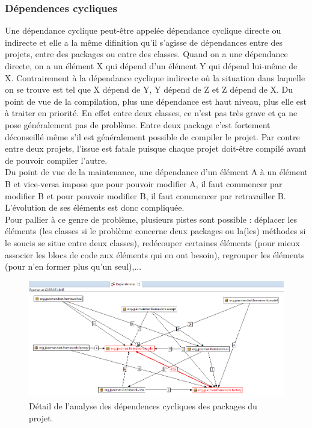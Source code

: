 \documentclass[12pt,a4paper,final]{article}
\begin{document}
\subsubsection{Dépendences cycliques}\label{dépendances}
Une dépendance cyclique peut-être appelée dépendance cyclique directe ou indirecte et elle a la même difinition qu'il s'agisse de dépendances entre des projets, entre des packages ou entre des classes. Quand on a une dépendance directe, on a un élément X qui dépend d’un élément Y qui dépend lui-même de X. Contrairement à la dépendance cyclique indirecte où la situation dans laquelle on se trouve est tel que X dépend de Y, Y dépend de Z et Z dépend de X.
Du point de vue de la compilation, plus une dépendance est haut niveau, plus elle est à traiter en priorité. En effet entre deux classes, ce n'est pas très grave et ça ne pose généralement pas de problème. Entre deux package c'est fortement déconseillé même s'il est généralement possible de compiler le projet. Par contre entre deux projets, l'issue est fatale puisque chaque projet doit-être compilé avant de pouvoir compiler l'autre.\\
Du point de vue de la maintenance, une dépendance d'un élément A à un élément B et vice-versa impose que pour pouvoir modifier A, il faut commencer par modifier B et pour pouvoir modifier B, il faut commencer par retravailler B. L'évolution de ses éléments est donc compliquée.\\
Pour pallier à ce genre de problème, plusieurs pistes sont possible : déplacer les éléments (les classes si le problème concerne deux packages ou la(les) méthodes si le soucis se situe entre deux classes), redécouper certaines éléments (pour mieux associer les blocs de code aux éléments qui en ont besoin), regrouper les éléments (pour n'en former plus qu'un seul),... %
\begin{figure}[!h]
	\centering
	\includegraphics[width=\textwidth]{DependenciesPackages.png}
	\caption{\label{dependenciesPackage}Détail de l'analyse des dépendences cycliques des packages du projet.}
\end{figure}
\end{document}
